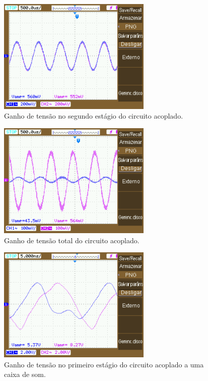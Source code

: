 \documentclass{article}
\begin{document}
    \begin{figure}[h!]
        \centering
        \includegraphics[height=5.5cm]{imgSource/NewFile3.png}
        \caption{Ganho de tensão no segundo estágio do circuito acoplado.}
        \label{fig:NewFile3}
    \end{figure}
    
    \begin{figure}[h!]
        \centering
        \includegraphics[height=5.5cm]{imgSource/NewFile4.png}
        \caption{Ganho de tensão total do circuito acoplado.}
        \label{fig:NewFile4}
    \end{figure}
    
    \begin{figure}[h!]
        \centering
        \includegraphics[height=5.5cm]{imgSource/NewFile10.png}
        \caption{Ganho de tensão no primeiro estágio do circuito acoplado a uma caixa de som.}
        \label{fig:NewFile10}
    \end{figure}
    
\end{document}
